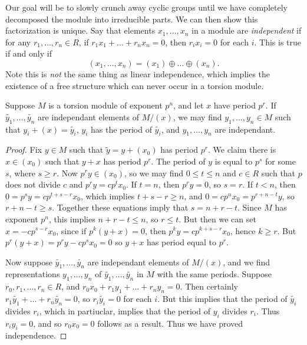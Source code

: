 Our goal will be to slowly crunch away cyclic groups until we have completely decomposed the module into irreducible parts. We can then show this factorization is unique. Say that elements $x_1,\dots, x_n$ in a module are \emph{independent} if for any $r_1,\dots,r_n \in R$, if $r_1x_1 + \dots + r_nx_n = 0$, then $r_ix_i = 0$ for each $i$. This is true if and only if
%
\[ (x_1,\dots,x_n) = (x_1) \oplus \dots \oplus (x_n). \]
%
Note this is \emph{not} the same thing as linear independence, which implies the existence of a free structure which can never occur in a torsion module.

\begin{lemma}
    Suppose $M$ is a torsion module of exponent $p^n$, and let $x$ have period $p^r$. If $\tilde{y_1},\dots, \tilde{y_n}$ are independant elements of $M/(x)$, we may find $y_1,\dots, y_n \in M$ such that $y_i + (x) = \tilde{y_i}$, $y_i$ has the period of $\tilde{y_i}$, and $y_1,\dots, y_n$ are independant.
\end{lemma}
\begin{proof}
    Fix $y \in M$ such that $\tilde{y} = y + (x_0)$ has period $p^r$. We claim there is $x \in (x_0)$ such that $y + x$ has period $p^r$. The period of $y$ is equal to $p^s$ for some $s$, where $s \geq r$. Now $p^r y \in (x_0)$, so we may find $0 \leq t \leq n$ and $c \in R$ such that $p$ does not divide $c$ and $p^r y = c p^t x_0$. If $t = n$, then $p^r y = 0$, so $s = r$. If $t < n$, then $0 = p^s y = c p^{t+s-r} x_0$, which implies $t+s-r \geq n$, and $0 = c p^n x_0 = p^{r+n-t} y$, so $r+n-t \geq s$. Together these equations imply that $s=n+r-t$. Since $M$ has exponent $p^n$, this implies $n+r-t \leq n$, so $r \leq t$. But then we can set $x = - c p^{s-r} x_0$, since if $p^k(y + x) = 0$, then $p^k y = c p^{k+s-r} x_0$, hence $k \geq r$. But $p^r(y+x) = p^r y - c p^s x_0 = 0$ so $y+x$ has period equal to $p^r$.

    Now suppose $\tilde{y_1}, \dots, \tilde{y_n}$ are independant elements of $M/(x)$, and we find representations $y_1,\dots,y_n$ of $\tilde{y_1},\dots,\tilde{y_n}$ in $M$ with the same periods. Suppose $r_0,r_1,\dots,r_n \in R$, and $r_0x_0 + r_1 y_1 + \dots + r_ny_n = 0$. Then certainly $r_1\tilde{y_1} + \dots + r_n \tilde{y_n} = 0$, so $r_i \tilde{y_i} = 0$ for each $i$. But this implies that the period of $\tilde{y_i}$ divides $r_i$, which in partiuclar, implies that the period of $y_i$ divides $r_i$. Thus $r_iy_i = 0$, and so $r_0x_0 = 0$ follows as a result. Thus we have proved independence.
\end{proof}

